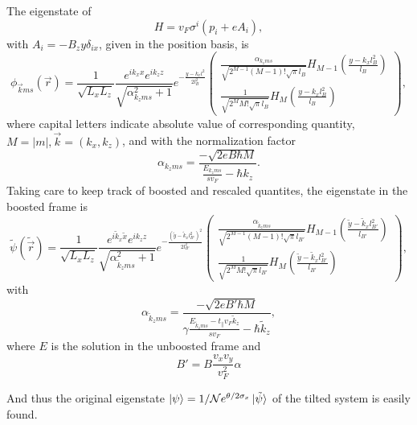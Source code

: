 The eigenstate of
\[
H = v_{F} \sigma ^{i} ( p_{i} + e A_{i} ),
\]
with \(A_{i} = - B_{z} y \delta _{i x}\), given in the position basis, is
\begin{equation}
  \phi _{\vec{k} m s}(\vec{r}) = \frac{1}{\sqrt{L_xL_z}}
  \frac{e^{ik_x x}e^{ik_z z}}{\sqrt{\alpha _{k_z m s}^2 + 1}}
  e^{-\frac{y-k_x l^2}{2 l_B^2}}
  \begin{pmatrix}
    \frac{\alpha _{k_z m s}}{\sqrt{2^{M-1} (M-1)! \sqrt{\pi } l_B}} H_{M-1}\left( \frac{y-k_x l_B^2}{l_B} \right)\\
    \frac{1}{\sqrt{2^M M! \sqrt{\pi } l_B}} H_M \left( \frac{y-k_x l_B^2}{l_B} \right)
  \end{pmatrix},
\end{equation}
where capital letters indicate absolute value of corresponding quantity, $M=|m|, \vec{k} = (k_x, k_z)$, and with the normalization factor
\begin{equation}
  \alpha _{k_z m s} = \frac{-\sqrt{2eB\hbar M}}{\frac{E_{k_z m s}}{s v_{F}} - \hbar  k_z}.
\end{equation}
Taking care to keep track of boosted and rescaled quantites, the eigenstate in the boosted frame is
\begin{equation}
  \label{eq:29}
  \tilde{\psi}(\tilde{\vec{r}}) =
  \frac{1}{\sqrt{L_xL_z}}
  \frac{e^{i \tilde{k}_x \tilde{x}}e^{i k_z z}}{\sqrt{\alpha _{\tilde{k}_z m s}^2 + 1}}
  e^{-\frac{\left(\tilde{y} - \tilde{k}_x l_{B'}^2\right)^2}{2 l_{B'}^2}}
  \begin{pmatrix}
    \frac{\alpha _{\tilde{k}_z m s}}{\sqrt{2^{M-1} (M-1)! \sqrt{\pi } l_{B'}}} H_{M-1}\left( \frac{\tilde{y} - \tilde{k}_x l_{B'}^2}{l_{B'}} \right)\\
    \frac{1}{\sqrt{2^M M! \sqrt{\pi } l_{B'}}} H_M \left( \frac{\tilde{y} - \tilde{k}_x l_{B'}^2}{l_{B'}} \right)
  \end{pmatrix},
\end{equation}
with
\begin{equation}
  \alpha _{\tilde{k}_z m s} = \frac{-\sqrt{2e B' \hbar M}}{ \gamma \frac{E_{\tilde{k}_z m s} - t_{\parallel} v_{F} \tilde{k}_{z}}{s v_{F}} - \hbar  \tilde{k}_z},
\end{equation}
where \(E\) is the solution in the unboosted frame and
\[
B' = B \frac{v_{x} v_{y}}{v_{F}^2} \alpha
\]


And thus the original eigenstate \(\ket{\psi } = 1 /\mathcal{N} e^{\theta /2 \sigma _{x}} \ket{\tilde{\psi} }\) of the tilted system is easily found.


